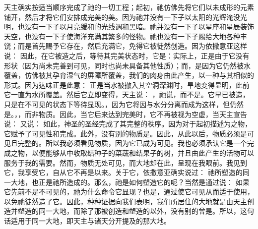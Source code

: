 天主确实按适当顺序完成了祂的一切工程；起初，祂仿佛先将它们以未成形的元素铺开，然后才将它们安排成完美的美。因为祂并没有一下子以太阳的光辉淹没光明，也没有一下子以月亮缓和的光线调和黑暗。祂并没有一下子以星座和星辰装饰天空，也没有一下子使海洋充满其繁多的怪物。祂也没有一下子赐给大地各种丰饶；而是首先赐予它存在，然后充满它，免得它被徒然创造。因为依撒意亚这样说：  因此，在它被造之后，等待其完美状态时，它是：实际上，正是由于它没有形状（因为尚未完善到可见，同时也尚未具备其他性质）；而，是因为它仍然被水覆盖，仿佛被其孕育湿气的屏障所覆盖，我们的肉身由此产生，以一种与其相似的形式。因为达味正是此意： 正是当水被撤入其空洞深渊时，旱地变得显明，此前它一直为水所覆盖。然后它立即变得，天主说：  ，祂说，而不是。它早已被造，只是在不可见的状态下等待显现。，因为它将因与水分分离而成为这样，但仍然是。，，而非物质。因此，当它后来达到完美时，它不再被视为空虚，当天主宣告说： 又说： 如此，神圣的圣经完成了其完整的秩序。因为对于起初描述为之物，它赋予了可见性和完成。此外，没有别的物质是。因此，从此以后，物质必须是可见且完整的。所以我必须看见物质，因为它已成为可见。我也必须承认它是一个完成之物，以便能够从中收取结种子的菜蔬和结果子的树，并且由此产生的活物可以服务于我的需要。然而，物质无处可见，而大地却在此，呈现在我眼前。我见到它，我享受它，自从它不再是以来。关于它，依撒意亚确实说过：  祂所塑造的同一大地，也正是祂所造成的。那么，祂是如何塑造它的呢？当然是通过说：  如果它先前不是不可见的，祂为什么命令它显现？也是，通过使它可见从而适于使用，以免祂徒然造了它。因此，种种证据向我们表明，我们所居住的大地就是由天主创造并塑造的同一大地，而除了那被创造和塑造的以外，没有别的曾是。所以，这句话适用于同一大地，即天主与诸天分开提及的那大地。\par


